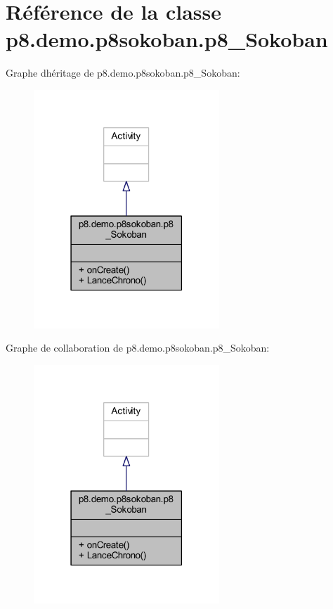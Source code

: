 \hypertarget{classp8_1_1demo_1_1p8sokoban_1_1p8___sokoban}{}\section{Référence de la classe p8.\+demo.\+p8sokoban.\+p8\+\_\+\+Sokoban}
\label{classp8_1_1demo_1_1p8sokoban_1_1p8___sokoban}


Graphe d\textquotesingle{}héritage de p8.\+demo.\+p8sokoban.\+p8\+\_\+\+Sokoban\+:
\nopagebreak
\begin{figure}[H]
\begin{center}
\leavevmode
\includegraphics[width=198pt]{classp8_1_1demo_1_1p8sokoban_1_1p8___sokoban__inherit__graph}
\end{center}
\end{figure}


Graphe de collaboration de p8.\+demo.\+p8sokoban.\+p8\+\_\+\+Sokoban\+:
\nopagebreak
\begin{figure}[H]
\begin{center}
\leavevmode
\includegraphics[width=198pt]{classp8_1_1demo_1_1p8sokoban_1_1p8___sokoban__coll__graph}
\end{center}
\end{figure}

